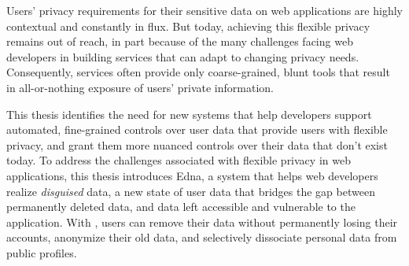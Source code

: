 Users' privacy requirements for their sensitive data on web applications are
highly contextual and constantly in flux.
%
But today, achieving this flexible privacy remains out of reach, in part because
of the many challenges facing web developers in building services that can adapt
to changing privacy needs. Consequently, services often provide only
coarse-grained, blunt tools that result in all-or-nothing exposure of users’
private information.

This thesis identifies the need for new systems that help developers support
automated, fine-grained controls over user data that provide users with flexible
privacy, and grant them more nuanced controls over their data that don't exist
today.
%
To address the challenges associated with flexible privacy in web applications,
this thesis introduces Edna, a system that helps web developers realize
\emph{disguised} data, a new state of user data that bridges the gap between
permanently deleted data, and data left accessible and vulnerable to the
application.  With \sys, users can remove their data without permanently losing
their accounts, anonymize their old data, and selectively dissociate personal
data from public profiles.
%
